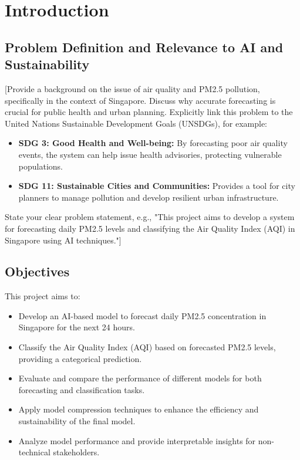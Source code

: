 \documentclass[11pt, a4paper]{article}
\begin{document}
\section{Introduction}

\subsection{Problem Definition and Relevance to AI and Sustainability}
[Provide a background on the issue of air quality and PM2.5 pollution, specifically in the context of Singapore. Discuss why accurate forecasting is crucial for public health and urban planning. Explicitly link this problem to the United Nations Sustainable Development Goals (UNSDGs), for example:
\begin{itemize}
    \item \textbf{SDG 3: Good Health and Well-being:} By forecasting poor air quality events, the system can help issue health advisories, protecting vulnerable populations.
    \item \textbf{SDG 11: Sustainable Cities and Communities:} Provides a tool for city planners to manage pollution and develop resilient urban infrastructure.
\end{itemize}
State your clear problem statement, e.g., "This project aims to develop a system for forecasting daily PM2.5 levels and classifying the Air Quality Index (AQI) in Singapore using AI techniques."]

\subsection{Objectives}
This project aims to:
\begin{itemize}
    \item Develop an AI-based model to forecast daily PM2.5 concentration in Singapore for the next 24 hours.
    \item Classify the Air Quality Index (AQI) based on forecasted PM2.5 levels, providing a categorical prediction.
    \item Evaluate and compare the performance of different models for both forecasting and classification tasks.
    \item Apply model compression techniques to enhance the efficiency and sustainability of the final model.
    \item Analyze model performance and provide interpretable insights for non-technical stakeholders.
\end{itemize}
\end{document}
